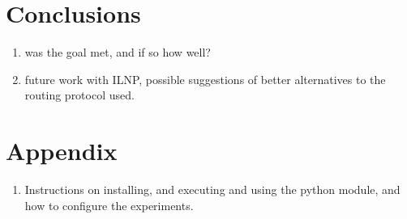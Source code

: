 \documentclass[12pt]{article}
\begin{document}
\section{Conclusions}

\begin{enumerate}	
\item was the goal met, and if so how well?
\item future work with ILNP, possible suggestions of better alternatives to the routing protocol used.
\end{enumerate}

\section{Appendix}
\begin{enumerate}
\item Instructions on installing, and executing and using the python module, and how to configure the experiments.
\end{enumerate}



\end{document}
